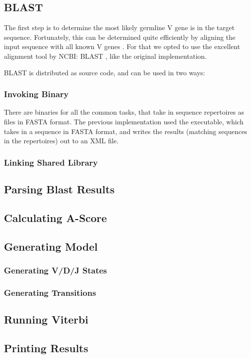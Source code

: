 \subsection{BLAST}
The first step is to determine the most likely germline V gene is in the target sequence. Fortunately, this can be determined quite efficiently by aligning the input sequence with all known V genes \cite{iHMMuneAlign}. For that we opted to use the excellent alignment tool by NCBI: BLAST \cite{blast}, like the original implementation.

BLAST is distributed as source code, and can be used in two ways:
\subsubsection{Invoking Binary}
There are binaries for all the common tasks, that take in sequence repertoires as files in FASTA \autocite{fasta} format. The previous implementation used the  executable, which takes in a sequence in FASTA format, and writes the results (matching sequences in the repertoires) out to an XML file.

\subsubsection{Linking Shared Library}
\lipsum[1]

\subsection{Parsing Blast Results}
\subsection{Calculating A-Score}
\subsection{Generating Model}
\subsubsection{Generating V/D/J States}
\subsubsection{Generating Transitions}
\subsection{Running Viterbi}
\subsection{Printing Results}


